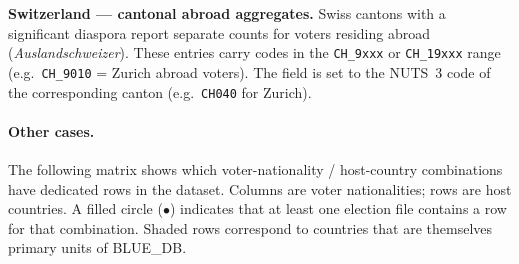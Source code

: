 \textbf{Switzerland --- cantonal abroad aggregates.}
Swiss cantons with a significant diaspora report separate counts for voters
residing abroad (\textit{Auslandschweizer}).
These entries carry codes in the \texttt{CH\_9xxx} or \texttt{CH\_19xxx} range
(e.g.\ \texttt{CH\_9010} = Zurich abroad voters).
The  field is set to the NUTS~3 code of the corresponding
canton (e.g.\ \texttt{CH040} for Zurich).

\paragraph{Other cases.} The following matrix shows which voter-nationality / host-country combinations
have dedicated rows in the dataset.
Columns are voter nationalities; rows are host countries.
A filled circle ($\bullet$) indicates that at least one election file contains
a row for that combination.
Shaded rows correspond to countries that are themselves primary units of
BLUE\_DB.

